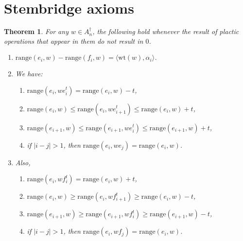 \documentclass[12pt]{amsproc}
\newcommand{\range}{\mathrm{range}}
\newcommand{\wt}{\mathrm{wt}}
\newtheorem{theorem}{Theorem}
\theoremstyle{definition}
\begin{document}
\section{Stembridge axioms}
\label{sec:stembridge-axioms}
\begin{theorem}
  For any $w\in A_n^\dagger$, the following hold whenever the result of plactic operations that appear in them do not result in $0$.
  \begin{enumerate}
  \item \label{item:range-sum} $\range(e_i,w)-\range(f_i,w)=\langle\wt(w),\alpha_i\rangle$.
  \item  \label{item:range-e} We have:
    \begin{enumerate}
    \item $\range(e_i,we_i^t)=\range(e_i,w)-t$,
    \item $\range(e_i,w)\leq \range(e_i,we_{i+1}^t)\leq \range(e_i,w)+t$,
    \item $\range(e_{i+1},w)\leq \range(e_{i+1},we_i^t)\leq \range(e_{i+1},w)+t$,
    \item if $|i-j|>1$, then $\range(e_i,we_j)=\range(e_i,w)$.
    \end{enumerate}
  \item Also,
    \begin{enumerate}
    \item $\range(e_i,wf_i^t)=\range(e_i,w)+t$,
    \item $\range(e_i,w)\geq \range(e_i,wf_{i+1}^t)\geq \range(e_i,w)-t$,
    \item $\range(e_{i+1},w)\geq \range(e_{i+1},wf_i^t)\geq \range(e_{i+1},w)-t$,
    \item if $|i-j|>1$, then $\range(e_i,wf_j)=\range(e_i,w)$.
    \end{enumerate}
  \end{enumerate}
\end{theorem}
\end{document}

